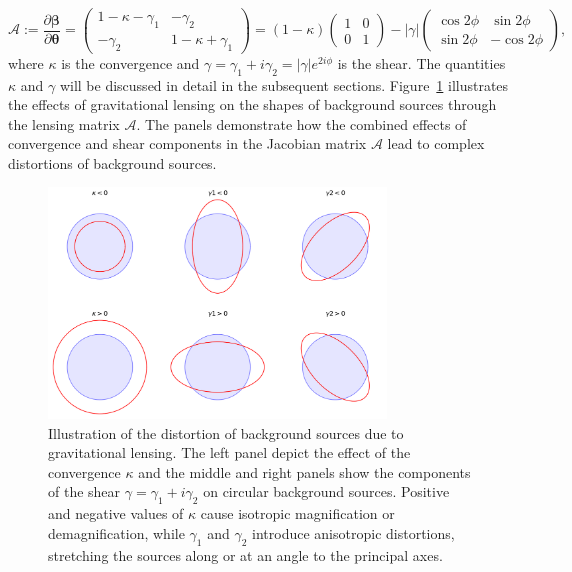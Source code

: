 \begin{equation}
\label{eq:jacobian_matrix}
    \mathcal{A} := \frac{\partial \boldsymbol{\beta}}{\partial \boldsymbol{\theta}} = 
    \begin{pmatrix}
        1 - \kappa - \gamma_1 & -\gamma_2 \\
        -\gamma_2 & 1 - \kappa + \gamma_1
    \end{pmatrix}
    = \left(1 - \kappa \right) 
    \begin{pmatrix}
        1 & 0 \\
        0 & 1
    \end{pmatrix}
    - |\gamma|
    \begin{pmatrix}
        \cos{2\phi} & \sin{2\phi} \\
        \sin{2\phi} & -\cos{2\phi}
    \end{pmatrix},
\end{equation}
where $\kappa$ is the convergence and $\gamma = \gamma_1 + i\gamma_2 = |\gamma| e^{2i\phi}$ is the shear.
The quantities $\kappa$ and $\gamma$ will be discussed in detail in the subsequent sections.
Figure~\ref{fig:distortion} illustrates the effects of gravitational lensing on the shapes of background sources through the lensing matrix $\mathcal{A}$. The panels demonstrate how the combined effects of convergence and shear components in the Jacobian matrix $\mathcal{A}$ lead to complex distortions of background sources.
\begin{figure}[ht]
    \centering
    \includegraphics[width=0.8\textwidth]{figures/distortion.png}
    \caption{Illustration of the distortion of background sources due to gravitational lensing. The left panel depict the effect of the convergence $\kappa$ and the middle and right panels show the components of the shear $\gamma = \gamma_1 + i\gamma_2$ on circular background sources. Positive and negative values of $\kappa$ cause isotropic magnification or demagnification, while $\gamma_1$ and $\gamma_2$ introduce anisotropic distortions, stretching the sources along or at an angle to the principal axes.}
    \label{fig:distortion}
\end{figure}

